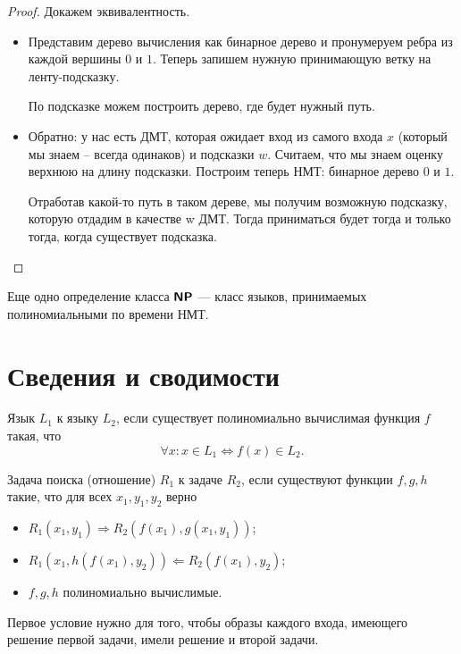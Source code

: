 \begin{proof}
	Докажем эквивалентность. 
	\begin{itemize}                                              \item Представим дерево вычисления как бинарное дерево и пронумеруем ребра из каждой вершины $ 0$ и $ 1$. Теперь запишем нужную     принимающую ветку на ленту-подсказку.
	
        По подсказке можем построить дерево, где будет нужный путь.
    \item Обратно: у нас есть ДМТ, которая ожидает вход из самого входа $x$ (который мы знаем -- всегда одинаков) и подсказки $w$.    
        Считаем, что мы знаем оценку верхнюю на длину подсказки. Построим теперь НМТ: бинарное дерево $0$ и $1$.

        Отработав какой-то путь в таком дереве, мы получим возможную подсказку, которую отдадим в качестве w ДМТ. Тогда приниматься будет тогда и только тогда, когда существует подсказка.
    \end{itemize}

\end{proof}
\begin{defn}\index{\NP}
    Еще одно определение класса $ \textmd{\textbf{\textsf{NP}}}$ --- класс языков, принимаемых полиномиальными по времени НМТ.
\end{defn}

\section{Сведения и сводимости}
\begin{defn}
	Язык $ L_1$   к языку $ L_2$, если существует полиномиально вычислимая функция $ f$ такая, что
	\[
		\forall x\colon x \in L_1 \Longleftrightarrow f(x) \in L_2
	.\] 
\end{defn}

\begin{defn}
	Задача поиска (отношение) $ R_1$  к задаче $ R_2$, если существуют функции $ f, g, h$ такие, что для всех  $ x_1, y_1, y_2$ верно
	\begin{itemize}
		\item $ R_1(x_1, y_1) \Longrightarrow R_2(f(x_1), g(x_1, y_1))$;
		\item $ R_1(x_1, h(f(x_1), y_2)) \Longleftarrow R_2(f(x_1), y_2)$;
		\item $ f, g, h$ полиномиально вычислимые.
	\end{itemize}
	\begin{note}
	    Первое условие нужно для того, чтобы образы каждого входа, имеющего решение первой задачи, имели решение и второй задачи.
	\end{note}
\end{defn}

